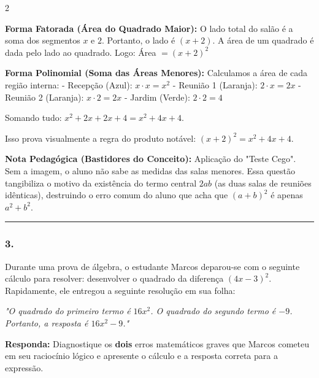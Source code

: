 \begin{multicols*}{2}
\begin{tcolorbox}[colback=CorTitUm!5, colframe=CorTitUm, boxrule=1pt, arc=4pt, left=6pt, right=6pt, top=6pt, bottom=6pt]
    \textbf{Forma Fatorada (Área do Quadrado Maior):}
    O lado total do salão é a soma dos segmentos $ x $ e $ 2 $. Portanto, o lado é $ (x + 2) $.
    A área de um quadrado é dada pelo lado ao quadrado. Logo:
    Área $ = (x + 2)^2 $
    
    \textbf{Forma Polinomial (Soma das Áreas Menores):}
    Calculamos a área de cada região interna:
    - Recepção (Azul): $ x \cdot x = x^2 $
    - Reunião 1 (Laranja): $ 2 \cdot x = 2x $
    - Reunião 2 (Laranja): $ x \cdot 2 = 2x $
    - Jardim (Verde): $ 2 \cdot 2 = 4 $
    
    Somando tudo: $ x^2 + 2x + 2x + 4 = x^2 + 4x + 4 $.
    
    Isso prova visualmente a regra do produto notável: $ (x + 2)^2 = x^2 + 4x + 4 $.
    \end{tcolorbox}
    \vspace{0.15cm}
    
    \begin{boxexplicacao}
    \textbf{Nota Pedagógica (Bastidores do Conceito):} Aplicação do "Teste Cego". Sem a imagem, o aluno não sabe as medidas das salas menores. Essa questão tangibiliza o motivo da existência do termo central $2ab$ (as duas salas de reuniões idênticas), destruindo o erro comum do aluno que acha que $(a+b)^2$ é apenas $a^2 + b^2$.
    \end{boxexplicacao}
\fi

\par\vspace{\espacoQuestao}

\noindent\textcolor{CorLinha}{\rule{\linewidth}{0.5pt}}
\par\vspace{\espacoPreQuestao}
\subsubsection*{3.} 
\begin{enunciadoLiteral}
Durante uma prova de álgebra, o estudante Marcos deparou-se com o seguinte cálculo para resolver: desenvolver o quadrado da diferença $ (4x - 3)^2 $. Rapidamente, ele entregou a seguinte resolução em sua folha:

\textit{"O quadrado do primeiro termo é $16x^2$. O quadrado do segundo termo é $-9$. Portanto, a resposta é $ 16x^2 - 9 $."}

\begin{boxresponda}
\textbf{Responda:} Diagnostique os \textbf{dois} erros matemáticos graves que Marcos cometeu em seu raciocínio lógico e apresente o cálculo e a resposta correta para a expressão.
\end{boxresponda}
\end{enunciadoLiteral}


\end{multicols*}
